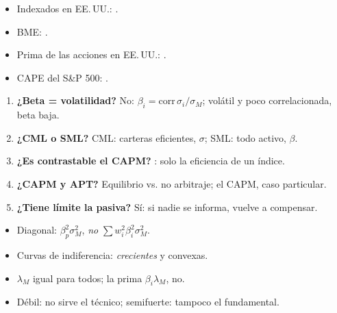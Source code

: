 \documentclass{article}
\begin{document}
\begin{columnas}
\anexorepaso
{}
\begin{itemize}
\item Indexados en EE.\,UU.: .
\item BME: .
\item Prima de las acciones en EE.\,UU.: .
\item CAPE del S\&P 500: .
\end{itemize}
\begin{enumerate}
\item \textbf{¿Beta = volatilidad?} No: $\beta_i=\mathrm{corr}\,\sigma_i/\sigma_M$; volátil y poco correlacionada, beta baja.
\item \textbf{¿CML o SML?} CML: carteras eficientes, $\sigma$; SML: todo activo, $\beta$.
\item \textbf{¿Es contrastable el CAPM?} : solo la eficiencia de un índice.
\item \textbf{¿CAPM y APT?} Equilibrio vs. no arbitraje; el CAPM, caso particular.
\item \textbf{¿Tiene límite la pasiva?} Sí: si nadie se informa, vuelve a compensar.
\end{enumerate}
\begin{trampa}
\begin{itemize}
\item Diagonal: $\beta_p^2\sigma_M^2$, \emph{no} $\sum w_i^2\beta_i^2\sigma_M^2$.
\item Curvas de indiferencia: \emph{crecientes} y convexas.
\item $\lambda_M$ igual para todos; la prima $\beta_i\lambda_M$, no.
\item Débil: no sirve el técnico; semifuerte: tampoco el fundamental.
\end{itemize}
\end{trampa}

\end{columnas}
\end{document}
